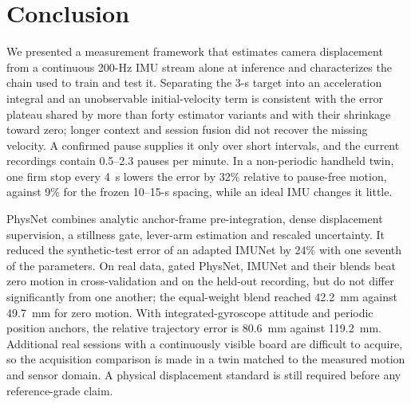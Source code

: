 \section{Conclusion}

We presented a measurement framework that estimates camera displacement from a
continuous 200-Hz IMU stream alone at inference and characterizes the chain
used to train and test it. Separating the 3-s target into an acceleration
integral and an unobservable initial-velocity term is consistent with the error
plateau shared by more than forty estimator variants and with their shrinkage
toward zero; longer context and session fusion did not recover the missing
velocity. A confirmed pause supplies it only over short intervals, and the
current recordings contain 0.5--2.3 pauses per minute. In a non-periodic
handheld twin, one firm stop every 4~s lowers the error by 32\% relative to
pause-free motion, against 9\% for the frozen 10--15-s spacing, while an ideal
IMU changes it little.

PhysNet combines analytic anchor-frame pre-integration, dense displacement
supervision, a stillness gate, lever-arm estimation and rescaled uncertainty.
It reduced the synthetic-test error of an adapted IMUNet by 24\% with one
seventh of the parameters. On real data, gated PhysNet, IMUNet and their blends
beat zero motion in cross-validation and on the held-out recording, but do not
differ significantly from one another; the equal-weight blend reached 42.2~mm
against 49.7~mm for zero motion. With integrated-gyroscope attitude and
periodic position anchors, the relative trajectory error is 80.6~mm against
119.2~mm. Additional real sessions with a continuously visible board are
difficult to acquire, so the acquisition comparison is made in a twin matched
to the measured motion and sensor domain. A physical displacement standard is
still required before any reference-grade claim.
